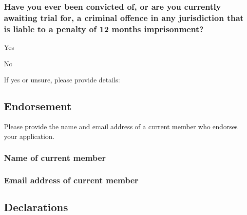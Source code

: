 \documentclass[a4paper,10pt]{article}
\begin{document}
\begin{Form}
\subsubsection{Have you ever been convicted of, or are you currently awaiting trial for, a criminal offence in any jurisdiction that is liable to a penalty of 12 months imprisonment?}

\ChoiceMenu[radio,radiosymbol=\ding{108},name=criminaloffenceradio]{ }{ } Yes

\ChoiceMenu[radio,radiosymbol=\ding{108},name=criminaloffenceradio]{ }{ } No

If yes or unsure, please provide details:

\begin{framed}%
  \TextField[width=\textwidth,donotscroll=true,multiline=true,name=criminaloffence]{ }%
\end{framed}%

\subsection{Endorsement}

Please provide the name and email address of a current member who endorses your application.

\subsubsection{Name of current member}

\begin{framed}%
  \TextField[width=\textwidth,donotscroll=true,name=endorsename]{ }%
\end{framed}%


\subsubsection{Email address of current member}

\begin{framed}%
  \TextField[width=\textwidth,donotscroll=true,name=endorseemail]{ }%
\end{framed}%

\subsection{Declarations}


\end{Form}
\end{document}
